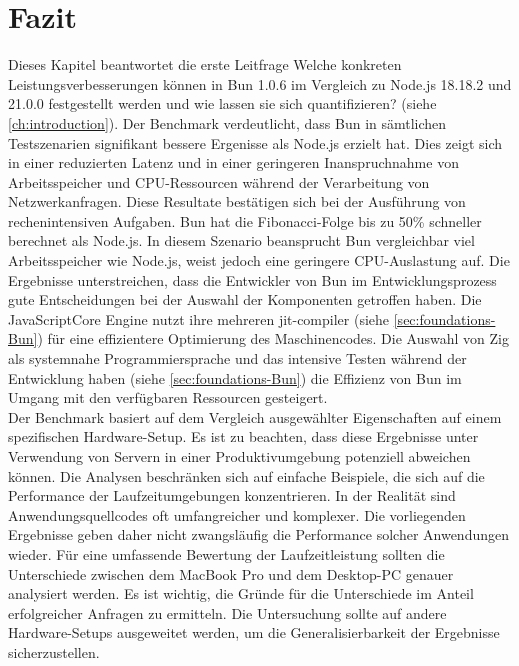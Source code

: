 \section{Fazit} \label{sec:performance-conclusion}
Dieses Kapitel beantwortet die erste Leitfrage \glqq Welche konkreten Leistungsverbesserungen können in Bun 1.0.6 im Vergleich zu Node.js 18.18.2 und 21.0.0 festgestellt werden und wie lassen sie sich quantifizieren?\grqq{} (siehe \autoref{ch:introduction}). Der Benchmark verdeutlicht, dass Bun in sämtlichen Testszenarien signifikant bessere Ergenisse als Node.js erzielt hat. Dies zeigt sich in einer reduzierten Latenz und in einer geringeren Inanspruchnahme von Arbeitsspeicher und CPU-Ressourcen während der Verarbeitung von Netzwerkanfragen. Diese Resultate bestätigen sich bei der Ausführung von rechenintensiven Aufgaben. Bun hat die Fibonacci-Folge bis zu 50\% schneller berechnet als Node.js. In diesem Szenario beansprucht Bun vergleichbar viel Arbeitsspeicher wie Node.js, weist jedoch eine geringere CPU-Auslastung auf. \newline
Die Ergebnisse unterstreichen, dass die Entwickler von Bun im Entwicklungsprozess gute Entscheidungen bei der Auswahl der Komponenten getroffen haben. Die JavaScriptCore Engine nutzt ihre mehreren \ac{jit-compiler} (siehe \autoref{sec:foundations-Bun}) für eine effizientere Optimierung des Maschinencodes. Die Auswahl von Zig als systemnahe Programmiersprache und das intensive Testen während der Entwicklung haben (siehe \autoref{sec:foundations-Bun}) die Effizienz von Bun im Umgang mit den verfügbaren Ressourcen gesteigert.\\

\noindent
Der Benchmark basiert auf dem Vergleich ausgewählter Eigenschaften auf einem spezifischen Hardware-Setup. Es ist zu beachten, dass diese Ergebnisse unter Verwendung von Servern in einer Produktivumgebung potenziell abweichen können. Die Analysen beschränken sich auf einfache Beispiele, die sich auf die Performance der Laufzeitumgebungen konzentrieren. In der Realität sind Anwendungsquellcodes oft umfangreicher und komplexer. Die vorliegenden Ergebnisse geben daher nicht zwangsläufig die Performance solcher Anwendungen wieder. Für eine umfassende Bewertung der Laufzeitleistung sollten die Unterschiede zwischen dem MacBook Pro und dem Desktop-PC genauer analysiert werden. Es ist wichtig, die Gründe für die Unterschiede im Anteil erfolgreicher Anfragen zu ermitteln. Die Untersuchung sollte auf andere Hardware-Setups ausgeweitet werden, um die Generalisierbarkeit der Ergebnisse sicherzustellen.